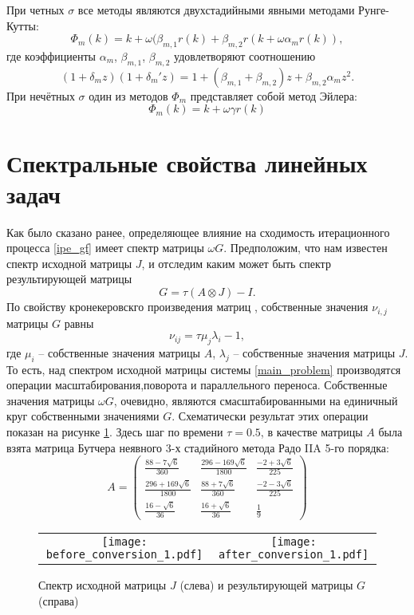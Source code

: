 \documentclass[a4paper, 14pt]{extreport} %
\begin{document}
При четных $\sigma$ все методы являются двухстадийными явными методами Рунге-Кутты:
$$\Phi_m(k) = k+\omega (\beta_{m,1}r(k)+\beta_{m,2}r(k+\omega \alpha_m r(k)),$$
где коэффициенты $\alpha_m$, $\beta_{m,1}$, $\beta_{m,2}$ удовлетворяют соотношению
$$(1+\delta_m z)(1+\delta_m'z)=1+(\beta_{m,1}+\beta_{m,2})z + \beta_{m,2}\alpha_{m}z^2.$$
При нечётных $\sigma$ один из методов $\Phi_m $ представляет собой метод Эйлера:
$$\Phi_m(k) = k+\omega \gamma r(k)$$

\section{Спектральные свойства линейных задач}
Как было сказано ранее, определяющее влияние на сходимость итерационного процесса \eqref{ipe_gf} имеет спектр матрицы $\omega G$. Предположим, что нам известен спектр исходной матрицы $J$, и отследим каким может быть спектр результирующей матрицы
$$G = \tau(A\otimes J) - I.$$
По свойству кронекеровскго произведения матриц \cite{dekker}, собственные значения $\nu_{i,j}$ матрицы $G$ равны
\begin{equation}\label{spektrG}
\nu_{ij} = \tau \mu_j \lambda_i - 1,
\end{equation}
где $\mu_i$ -- собственные значения матрицы $A$, $\lambda_j$ -- собственные значения матрицы $J$. То есть, над  спектром исходной матрицы системы \eqref{main_problem} производятся операции масштабирования,поворота и параллельного переноса. Собственные значения матрицы $\omega G$, очевидно, являются смасштабированными на единичный круг собственными значениями  $G$. Схематически результат этих операции показан на рисунке \ref{bad_conversion}. Здесь шаг по времени $\tau = 0.5$, в качестве матрицы $A$ была взята матрица Бутчера неявного 3-х стадийного метода Радо IIA 5-го порядка:
\begin{equation}A=\left(
\begin{array}{lll}
 \frac{88-7\sqrt{6}}{360} & \frac{296-169\sqrt{6}}{1800} & \frac{-2+3\sqrt{6}}{225} \\
 \frac{296+169\sqrt{6}}{1800} & \frac{88+7\sqrt{6}}{360} & \frac{-2-3\sqrt{6}}{225} \\
 \frac{16-\sqrt{6}}{36} &\frac{16+\sqrt{6}}{36} & \frac{1}{9}
\end{array}
\right)
\label{butcher_matrix_for_pics}
\end{equation}
\begin{figure}
\begin{center}
\begin{tabular}{cc}
 \texttt{[image: before\_conversion\_1.pdf]}&\texttt{[image: after\_conversion\_1.pdf]}
\end{tabular}
\end{center}
\caption{\small Спектр исходной матрицы $J$ (слева) и  результирующей матрицы $G$ (справа)}
\label{bad_conversion}
\end{figure}
\end{document}
